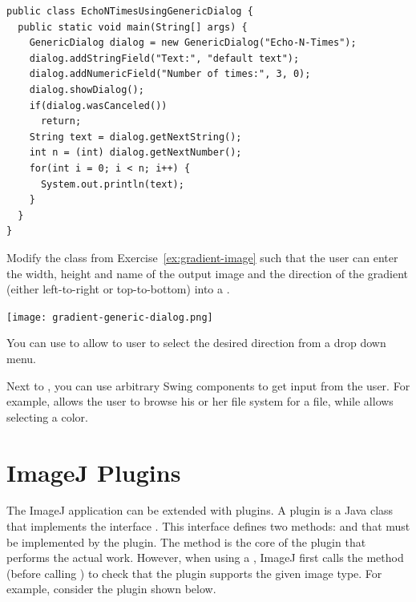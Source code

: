 \documentclass{book}
\begin{document}
\begin{lstlisting}
public class EchoNTimesUsingGenericDialog {
  public static void main(String[] args) {
    GenericDialog dialog = new GenericDialog("Echo-N-Times");
    dialog.addStringField("Text:", "default text");
    dialog.addNumericField("Number of times:", 3, 0);
    dialog.showDialog();
    if(dialog.wasCanceled())
      return;
    String text = dialog.getNextString();
    int n = (int) dialog.getNextNumber();
    for(int i = 0; i < n; i++) {
      System.out.println(text);    
    }
  }
}
\end{lstlisting}

\begin{exercise}
Modify the class  from Exercise~\ref{ex:gradient-image} such that the user can enter the width, height and name of the output image and the direction of the gradient (either left-to-right or top-to-bottom) into a . 

\begin{center}
\texttt{[image: gradient-generic-dialog.png]}
\end{center}

You can use  to allow to user to select the desired direction from a drop down menu. 
\end{exercise}

Next to , you can use arbitrary Swing components to get input from the user. For example,  allows the user to browse his or her file system for a file, while  allows selecting a color.


\section{ImageJ Plugins}
The ImageJ application can be extended with plugins. A plugin is a Java class that implements the interface . This interface defines two methods:  and  that must be implemented by the plugin. The  method is the core of the plugin that performs the actual work. However, when using a , ImageJ first calls the  method (before calling ) to check that the plugin supports the given image type. For example, consider the plugin  shown below.
\end{document}
